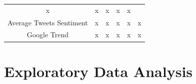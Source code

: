 \documentclass[12pt,oneside]{chicagocapstone}
\begin{document}
\begin{longtable}[]{@{}cccccc@{}}
\begin{minipage}[t]{0.11\columnwidth}
x\strut
\end{minipage} & \begin{minipage}[t]{0.12\columnwidth}\centering
x\strut
\end{minipage} & \begin{minipage}[t]{0.14\columnwidth}\centering
x\strut
\end{minipage} & \begin{minipage}[t]{0.14\columnwidth}\centering
x\strut
\end{minipage} & \begin{minipage}[t]{0.12\columnwidth}\centering
x\strut
\end{minipage}\tabularnewline
\begin{minipage}[t]{0.21\columnwidth}\centering
Average Tweets Sentiment\strut
\end{minipage} & \begin{minipage}[t]{0.11\columnwidth}\centering
x\strut
\end{minipage} & \begin{minipage}[t]{0.12\columnwidth}\centering
x\strut
\end{minipage} & \begin{minipage}[t]{0.14\columnwidth}\centering
x\strut
\end{minipage} & \begin{minipage}[t]{0.14\columnwidth}\centering
x\strut
\end{minipage} & \begin{minipage}[t]{0.12\columnwidth}\centering
x\strut
\end{minipage}\tabularnewline
\begin{minipage}[t]{0.21\columnwidth}\centering
Google Trend\strut
\end{minipage} & \begin{minipage}[t]{0.11\columnwidth}\centering
x\strut
\end{minipage} & \begin{minipage}[t]{0.12\columnwidth}\centering
x\strut
\end{minipage} & \begin{minipage}[t]{0.14\columnwidth}\centering
x\strut
\end{minipage} & \begin{minipage}[t]{0.14\columnwidth}\centering
x\strut
\end{minipage} & \begin{minipage}[t]{0.12\columnwidth}\centering
x\strut
\end{minipage}\tabularnewline
\bottomrule
\end{longtable}
\hypertarget{methodology-descriptive}{%
\section*{Exploratory Data Analysis}\label{methodology-descriptive}}
\end{document}
